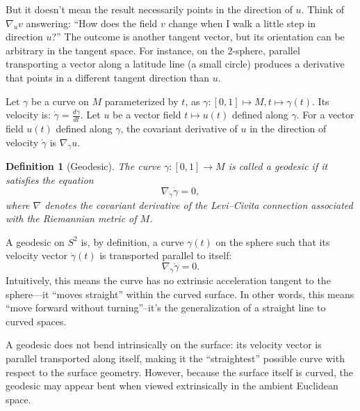 \documentclass{article}
\newtheorem{definition}{Definition}
\begin{document}
But it doesn’t mean the result necessarily points in the direction of $u$. Think of $\nabla_u v$ answering: “How does the field 
$v$ change when I walk a little step in direction $u$?” The outcome is another tangent vector, but its orientation can be arbitrary in the tangent space. For instance, on the 2-sphere, parallel transporting a vector along a latitude line (a small circle) produces a derivative that points in a different tangent direction than $u$.


Let $\gamma$ be a curve on $M$ parameterized by $t$, as $\gamma:[0,1] \mapsto M, t \mapsto \gamma(t)$. Its velocity is: $\dot{\gamma}=\frac{d \gamma}{d t}$. Let $u$ be a vector field $t \mapsto u(t)$ defined along $\gamma$. For a vector field $u(t)$ defined along $\gamma$, the covariant derivative of $u$ in the direction of velocity $\dot{\gamma}$ is $\nabla_{\dot{\gamma}} u$.

\begin{definition}[Geodesic]
The curve $\gamma:[0,1]\to M$ is called a geodesic if it satisfies
the equation
\[
\nabla_{\dot{\gamma}} \dot{\gamma} = 0,
\]
where $\nabla$ denotes the covariant derivative of the Levi--Civita
connection associated with the Riemannian metric of $M$.
\end{definition}

A geodesic on $S^2$ is, by definition, a curve  $\gamma(t)$ on the sphere such that its velocity vector 
$\dot{\gamma}(t)$ is transported parallel to itself:
\[
\nabla_{\dot{\gamma}} \dot{\gamma} = 0.
\]
Intuitively, this means the curve has no extrinsic acceleration tangent to the sphere---it ``moves straight'' within the curved surface. 
In other words, this means “move forward without turning”--it’s the generalization of a straight line to curved spaces. 

A geodesic does not bend intrinsically on the surface: its velocity  vector is parallel transported along itself, making it the ``straightest'' 
possible curve with respect to the surface geometry. However, because  the surface itself is curved, the geodesic may appear bent when viewed 
extrinsically in the ambient Euclidean space.
\end{document}
